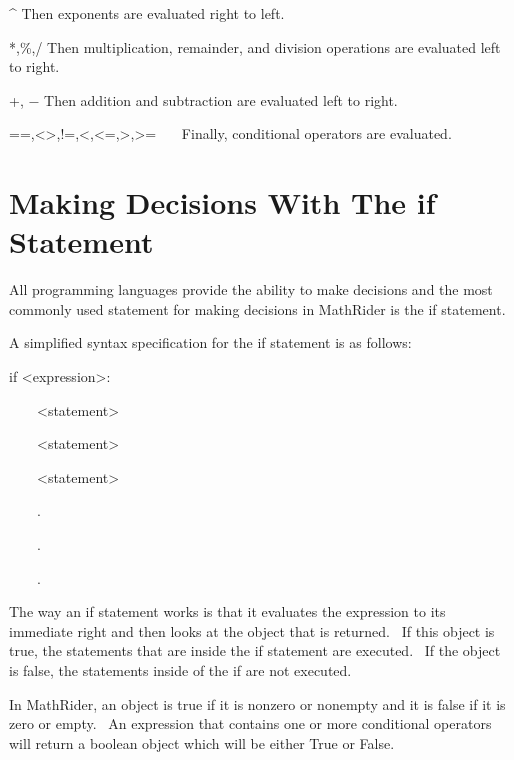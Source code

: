 \documentclass[12pt,twoside]{book}
\begin{document}
\^{} Then exponents are evaluated right to left.


\bigskip

*,\%,/ Then multiplication, remainder, and division operations are
evaluated left to right.


\bigskip

+, $-$ Then addition and subtraction are evaluated left to right.


\bigskip

==,{\textless}{\textgreater},!=,{\textless},{\textless}=,{\textgreater},{\textgreater}=
\ \ \ Finally, conditional operators are evaluated.

\section[Making Decisions With The if Statement]{Making Decisions With The if Statement}

All programming languages provide the ability to make decisions and the
most commonly used statement for making decisions in MathRider is the
if statement.


\bigskip

A simplified syntax specification for the if statement is as follows:


\bigskip

if {\textless}expression{\textgreater}:

\ \ \ \ {\textless}statement{\textgreater}

\ \ \ \ {\textless}statement{\textgreater}

\ \ \ \ {\textless}statement{\textgreater}

\ \ \ \ .

\ \ \ \ .

\ \ \ \ .


\bigskip

The way an if statement works is that it evaluates the expression to its
immediate right and then looks at the object that is returned. \ If
this object is {\textquotedbl}true{\textquotedbl}, the statements that
are inside the if statement are executed. \ If the object is
{\textquotedbl}false{\textquotedbl}, the statements inside of the if
are not executed.


\bigskip

In MathRider, an object is {\textquotedbl}true{\textquotedbl} if it is
nonzero or nonempty and it is {\textquotedbl}false{\textquotedbl} if it
is zero or empty. \ An expression that contains one or more conditional
operators will return a boolean object which will be either True or
False.
\end{document}
